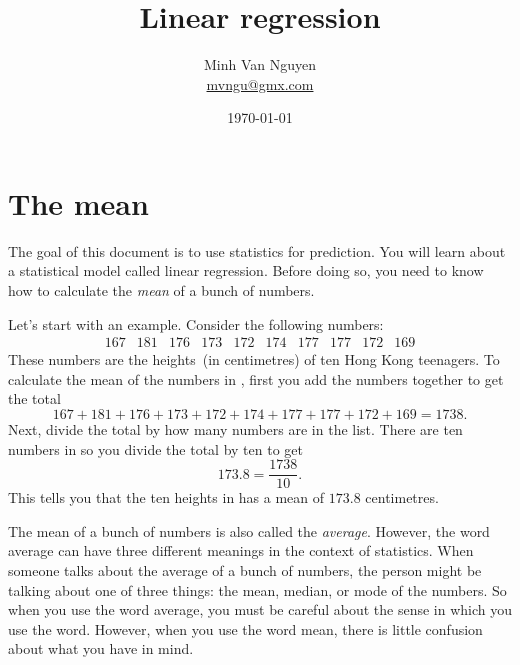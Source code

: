\documentclass[a4paper,oneside,12pt]{article}
\begin{document}
\title{\Large\bf Linear regression}
\author{%
  Minh Van Nguyen \\
  \url{mvngu@gmx.com}
}
\date{\today}
\maketitle



\section{The mean}

The goal of this document is to use statistics for prediction.  You
will learn about a statistical model called linear regression.  Before
doing so, you need to know how to calculate the \emph{mean} of a bunch
of numbers.

Let's start with an example.  Consider the following numbers:
\begin{equation}
\label{eqn:Hong_Kong_teenagers_heights}
\begin{matrix}
167 & 181 & 176 & 173 & 172 & 174 & 177 & 177 & 172 & 169
\end{matrix}
\end{equation}
These numbers are the heights~(in centimetres) of ten Hong Kong
teenagers.  To calculate the mean of the numbers in
, first you add the numbers
together to get the total
\[
167 + 181 + 176 + 173 + 172 + 174 + 177 + 177 + 172 + 169
=
1738.
\]
Next, divide the total by how many numbers are in the list.  There are
ten numbers in  so you divide
the total by ten to get
\[
173.8
=
\frac{1738}{10}.
\]
This tells you that the ten heights in
 has a mean of $173.8$
centimetres.

The mean of a bunch of numbers is also called the \emph{average}.
However, the word average can have three different meanings in the
context of statistics.  When someone talks about the average of a
bunch of numbers, the person might be talking about one of three
things: the mean, median, or mode of the numbers.  So when you use the
word average, you must be careful about the sense in which you use the
word.  However, when you use the word mean, there is little confusion
about what you have in mind.
\end{document}
